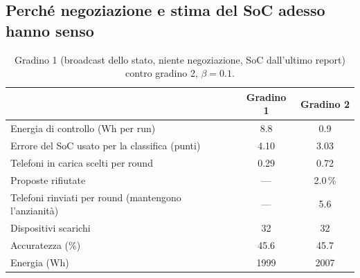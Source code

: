 \documentclass[11pt,a4paper]{article}
\begin{document}
\newpage

\subsection{Perché negoziazione e stima del SoC adesso hanno senso}

\begin{table}[H]
  \centering
  \caption{Gradino 1 (broadcast dello stato, niente negoziazione, SoC
  dall'ultimo report) contro gradino 2, $\beta = 0.1$.}
  \label{tab:negest}
  \begin{tabular}{lcc}
    \toprule
    & Gradino 1 & Gradino 2 \\
    \midrule
    Energia di controllo (Wh per run)                  & 8.8   & 0.9 \\
    Errore del SoC usato per la classifica (punti)     & 4.10  & 3.03 \\
    Telefoni in carica scelti per round                & 0.29  & 0.72 \\
    Proposte rifiutate                                 & ---   & 2.0\,\% \\
    Telefoni rinviati per round (mantengono l'anzianità) & --- & 5.6 \\
    Dispositivi scarichi                               & 32    & 32 \\
    Accuratezza (\%)                                   & 45.6  & 45.7 \\
    Energia (Wh)                                       & 1999  & 2007 \\
    \bottomrule
  \end{tabular}
\end{table}
\end{document}
